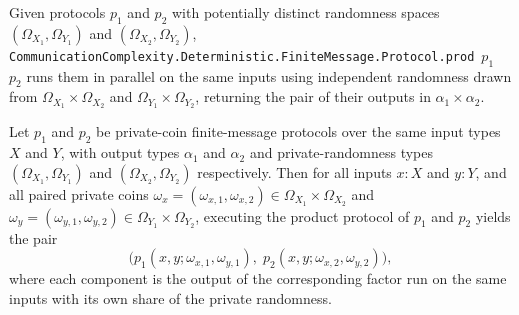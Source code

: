 \begin{definition}
\label{CommunicationComplexity.PrivateCoin.FiniteMessage.Protocol.prod}
\leanok
{}
Given protocols $p_1$ and $p_2$ with potentially distinct randomness spaces
$(\Omega_{X_1}, \Omega_{Y_1})$ and $(\Omega_{X_2}, \Omega_{Y_2})$,
\texttt{CommunicationComplexity.Deterministic.FiniteMessage.Protocol.prod}~$p_1$~$p_2$ runs them in parallel on the same inputs using independent
randomness drawn from $\Omega_{X_1} \times \Omega_{X_2}$ and $\Omega_{Y_1} \times \Omega_{Y_2}$,
returning the pair of their outputs in $\alpha_1 \times \alpha_2$.
\end{definition}

\begin{theorem}
\label{CommunicationComplexity.PrivateCoin.FiniteMessage.Protocol.prod_rrun}
\leanok
{}
Let $p_1$ and $p_2$ be private-coin finite-message protocols over the same input types
$X$ and $Y$, with output types $\alpha_1$ and $\alpha_2$ and private-randomness types
$(\Omega_{X_1}, \Omega_{Y_1})$ and $(\Omega_{X_2}, \Omega_{Y_2})$ respectively. Then for
all inputs $x : X$ and $y : Y$, and all paired private coins $\omega_x = (\omega_{x,1},
\omega_{x,2}) \in \Omega_{X_1} \times \Omega_{X_2}$ and $\omega_y = (\omega_{y,1},
\omega_{y,2}) \in \Omega_{Y_1} \times \Omega_{Y_2}$, executing the product protocol of
$p_1$ and $p_2$ yields the pair
\[
\bigl(p_1(x, y; \omega_{x,1}, \omega_{y,1}),\; p_2(x, y; \omega_{x,2},
\omega_{y,2})\bigr),
\]
where each component is the output of the corresponding factor run on the same inputs
with its own share of the private randomness.
\end{theorem}

